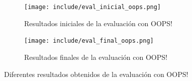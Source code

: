 \documentclass[a4paper,12pt]{article}
\begin{document}
	\begin{figure}[H]
		\begin{subfigure}{.5\textwidth}
			\centering
			\texttt{[image: include/eval\_inicial\_oops.png]}
			\caption{Resultados iniciales de la evaluación con OOPS! }
		\end{subfigure}
		\begin{subfigure}{.5\textwidth}
			\centering
			\texttt{[image: include/eval\_final\_oops.png]}
			\caption{Resultados finales de la evaluación con OOPS!}
		\end{subfigure}
		\caption{Diferentes resultados obtenidos de la evaluación con OOPS!}
	\end{figure}
	
	
\end{document}
